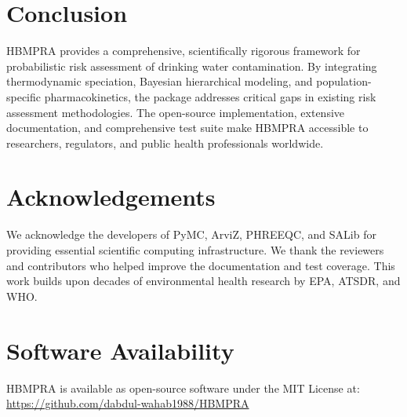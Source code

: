 \documentclass[11pt,a4paper]{article}
\begin{document}
\section{Conclusion}

HBMPRA provides a comprehensive, scientifically rigorous framework for probabilistic risk assessment of drinking water contamination. By integrating thermodynamic speciation, Bayesian hierarchical modeling, and population-specific pharmacokinetics, the package addresses critical gaps in existing risk assessment methodologies. The open-source implementation, extensive documentation, and comprehensive test suite make HBMPRA accessible to researchers, regulators, and public health professionals worldwide.

\section*{Acknowledgements}

We acknowledge the developers of PyMC, ArviZ, PHREEQC, and SALib for providing essential scientific computing infrastructure. We thank the reviewers and contributors who helped improve the documentation and test coverage. This work builds upon decades of environmental health research by EPA, ATSDR, and WHO.

\section*{Software Availability}

HBMPRA is available as open-source software under the MIT License at: \\
\url{https://github.com/dabdul-wahab1988/HBMPRA}



\end{document}
